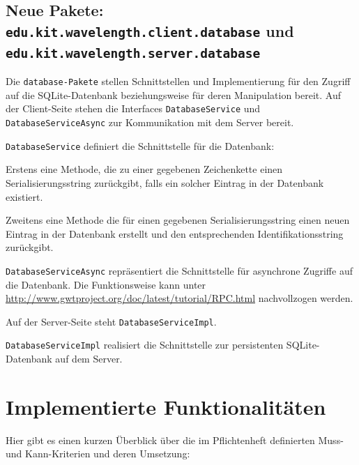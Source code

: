 \documentclass[parskip=full,11pt]{scrartcl}
\begin{document}
\subsection[Hinzugefügte Pakete]{Neue Pakete: \texttt{edu.kit.wavelength.client.database} und \texttt{edu.kit.wavelength.server.database}}

Die \texttt{database-Pakete} stellen Schnittstellen und Implementierung für den Zugriff auf die SQLite-Datenbank beziehungsweise für deren Manipulation bereit.
Auf der Client-Seite stehen die Interfaces \texttt{DatabaseService} und \texttt{DatabaseServiceAsync} zur Kommunikation mit dem Server bereit.

\texttt{DatabaseService} definiert die Schnittstelle für die Datenbank: 

Erstens eine Methode, die zu einer gegebenen Zeichenkette einen Serialisierungsstring zurückgibt,
falls ein solcher Eintrag in der Datenbank existiert. 

Zweitens eine Methode die für einen gegebenen Serialisierungsstring einen neuen Eintrag in der Datenbank erstellt und den entsprechenden Identifikationsstring zurückgibt.

\texttt{DatabaseServiceAsync} repräsentiert die Schnittstelle für asynchrone Zugriffe auf die Datenbank.
Die Funktionsweise kann unter \href{http://www.gwtproject.org/doc/latest/tutorial/RPC.html}{http://www.gwtproject.org/doc/latest/tutorial/RPC.html} nachvollzogen werden.

Auf der Server-Seite steht \texttt{DatabaseServiceImpl}.

\texttt{DatabaseServiceImpl} realisiert die Schnittstelle zur persistenten SQLite-Datenbank auf dem Server.

\newpage
\section{Implementierte Funktionalitäten}
Hier gibt es einen kurzen Überblick über die im Pflichtenheft definierten Muss- und Kann-Kriterien und deren Umsetzung:
\end{document}
